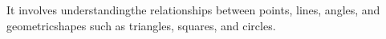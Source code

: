 \documentclass[preview]{standalone}
\begin{document}
\begin{center}
It involves understandingthe relationships between points, lines, angles, and geometricshapes such as triangles, squares, and circles.
\end{center}
\end{document}
